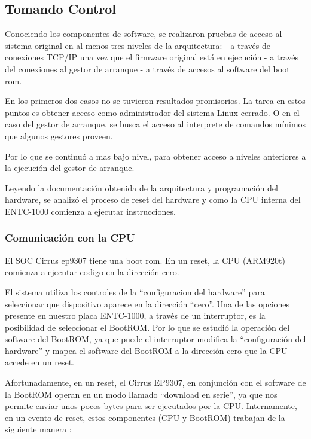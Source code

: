 \documentclass[conference]{IEEEtran}
\begin{document}
\subsection{Tomando Control}

Conociendo los componentes de software, se realizaron pruebas
de acceso al sistema original en al menos tres niveles de la arquitectura:
- a través de conexiones TCP/IP una vez que el firmware original está en ejecución
- a través del conexiones al gestor de arranque
- a través de accesos al software del boot rom.

En los primeros dos casos no se tuvieron resultados promisorios.
La tarea en estos puntos es obtener acceso como administrador del sistema
Linux cerrado. O en el caso del gestor de arranque, se busca
el acceso al interprete de comandos mínimos que algunos gestores proveen.

Por lo que se continuó a mas bajo nivel, para obtener acceso a niveles
anteriores a la ejecución del gestor de arranque.

Leyendo la documentación obtenida de la arquitectura y programación del hardware,
se analizó el proceso de reset del hardware y como la CPU interna
del ENTC-1000 comienza a ejecutar instrucciones.

\subsubsection{Comunicación con la CPU}

El SOC Cirrus ep9307 tiene una boot rom.
En un reset, la CPU (ARM920t) comienza a ejecutar codigo en la dirección cero.

El sistema utiliza los controles de la ``configuracion del hardware'' para seleccionar
que dispositivo aparece en la dirección ``cero''.
Una de las opciones presente en nuestro placa ENTC-1000, a través de un interruptor,
es la posibilidad de seleccionar el BootROM. Por lo que se estudió
la operación del software del BootROM, ya que puede el interruptor
modifica la ``configuración del hardware'' y mapea el software del BootROM
a la dirección cero que la CPU accede en un reset.

Afortunadamente, en un reset, el Cirrus EP9307, en conjunción
con el software de la BootROM operan en un modo llamado 
``download en serie'', ya que nos permite enviar unos pocos
bytes para ser ejecutados por la CPU. Internamente, en un evento de reset,
estos componentes (CPU y BootROM) trabajan de la siguiente manera :
\end{document}
